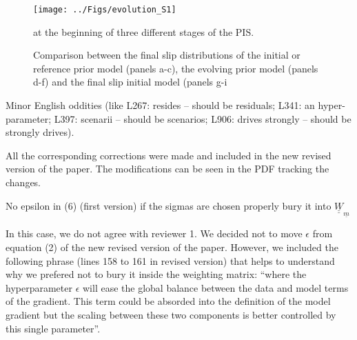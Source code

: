 \documentclass[10pt]{extarticle}
\begin{document}
\begin{Answer}
\begin{figure}[!h]
\begin{center}
  \texttt{[image: ../Figs/evolution\_S1]}
\end{center}
  \caption{Comparison between the final slip distributions of the initial or reference 
  prior model (panels a-c), the evolving prior model (panels d-f) and the final slip 
  initial model (panels g-i} at the beginning of three different stages of the PIS.
    \label{fig:figure_s1}
\end{figure}
 \WorkInProgressRevTask
\end{Answer}
%
%
\begin{ReviewerComment}{1}
\noindent 
 Minor English oddities (like L267: resides – should be residuals; L341: an hyper-parameter;
 L397: scenarii – should be scenarios; L906: drives strongly – should be strongly drives).
\end{ReviewerComment}
%
\begin{Answer}
All the corresponding corrections were made and included in the new revised version of the 
paper. The modifications can be seen in the PDF tracking the changes.
 \RevTaskDone
\end{Answer}
%
%
\begin{ReviewerComment}{1}
\noindent 
 No epsilon in (6) (first version) if the sigmas are chosen properly \textemdash bury it 
 into $\underline{\underline{W}}_{\underline{m}}$
\end{ReviewerComment}
%
\begin{Answer}
 In this case, we do not agree with reviewer 1. We decided not to move $\epsilon$ from equation
 (2) of the new revised version of the paper. However, we included the following phrase 
 (lines 158 to 161 in revised version) that helps to understand why we prefered not to bury it inside the weighting 
 matrix: ``where the hyperparameter $\epsilon$ will ease the global balance between the data and 
 model terms of the gradient. This term could be absorded into the definition of the model gradient 
 but the scaling between these two components is better controlled by this single parameter''.
 \WorkInProgressRevTask
\end{Answer}
\end{document}
